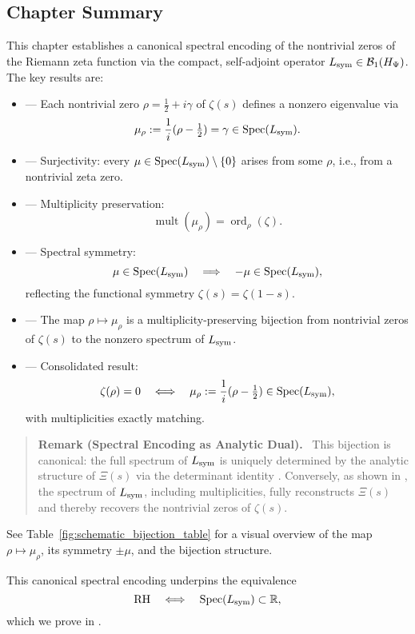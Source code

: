 \subsection*{Chapter Summary}

This chapter establishes a canonical spectral encoding of the nontrivial zeros of the Riemann zeta function via the compact, self-adjoint operator \( L_{\mathrm{sym}} \in \mathcal{B}_1(H_{\Psi}) \). The key results are:

\begin{itemize}
  \item {} — Each nontrivial zero \( \rho = \tfrac{1}{2} + i\gamma \) of \( \zeta(s) \) defines a nonzero eigenvalue via
  \[
  \mu_\rho := \frac{1}{i}(\rho - \tfrac{1}{2}) = \gamma \in \operatorname{Spec}(L_{\mathrm{sym}}).
  \]

  \item {} — Surjectivity: every \( \mu \in \operatorname{Spec}(L_{\mathrm{sym}}) \setminus \{0\} \) arises from some \( \rho \), i.e., from a nontrivial zeta zero.

  \item {} — Multiplicity preservation:
  \[
  \operatorname{mult}(\mu_\rho) = \operatorname{ord}_\rho(\zeta).
  \]

  \item {} — Spectral symmetry:
  \[
  \mu \in \operatorname{Spec}(L_{\mathrm{sym}}) \quad \Longrightarrow \quad -\mu \in \operatorname{Spec}(L_{\mathrm{sym}}),
  \]
  reflecting the functional symmetry \( \zeta(s) = \zeta(1 - s) \).

  \item {} — The map \( \rho \mapsto \mu_\rho \) is a multiplicity-preserving bijection from nontrivial zeros of \( \zeta(s) \) to the nonzero spectrum of \( L_{\mathrm{sym}} \).

  \item {} — Consolidated result:
  \[
  \zeta(\rho) = 0 \quad \Longleftrightarrow \quad \mu_\rho := \frac{1}{i}(\rho - \tfrac{1}{2}) \in \operatorname{Spec}(L_{\mathrm{sym}}),
  \]
  with multiplicities exactly matching.
\end{itemize}

\begin{quote}
  \textbf{Remark (Spectral Encoding as Analytic Dual).}~
  This bijection is canonical: the full spectrum of \( L_{\mathrm{sym}} \) is uniquely determined by the analytic structure of \( \Xi(s) \) via the determinant identity . Conversely, as shown in , the spectrum of \( L_{\mathrm{sym}} \), including multiplicities, fully reconstructs \( \Xi(s) \) and thereby recovers the nontrivial zeros of \( \zeta(s) \).
\end{quote}

See Table~\ref{fig:schematic_bijection_table} for a visual overview of the map \( \rho \mapsto \mu_\rho \), its symmetry \( \pm\mu \), and the bijection structure.

\medskip

This canonical spectral encoding underpins the equivalence
\[
\mathrm{RH} \quad \Longleftrightarrow \quad \operatorname{Spec}(L_{\mathrm{sym}}) \subset \mathbb{R},
\]
which we prove in .
